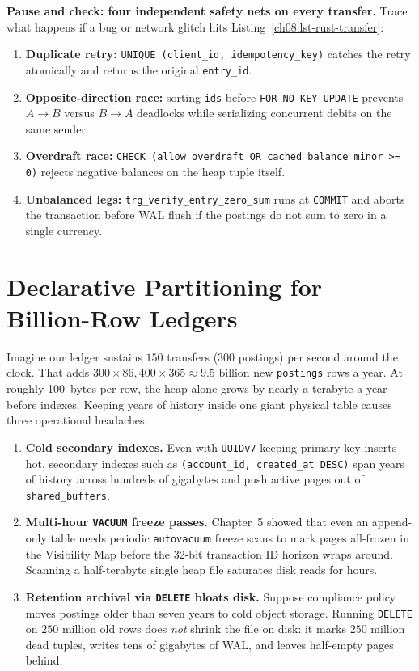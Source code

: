 \begin{recoverybox}
\textbf{Pause and check: four independent safety nets on every transfer.}
Trace what happens if a bug or network glitch hits Listing~\ref{ch08:lst-rust-transfer}:
\begin{enumerate}
  \item \textbf{Duplicate retry:} \texttt{UNIQUE (client\_id, idempotency\_key)} catches the retry atomically and returns the original \texttt{entry\_id}.
  \item \textbf{Opposite-direction race:} sorting \texttt{ids} before \texttt{FOR NO KEY UPDATE} prevents $A \to B$ versus $B \to A$ deadlocks while serializing concurrent debits on the same sender.
  \item \textbf{Overdraft race:} \texttt{CHECK (allow\_overdraft OR cached\_balance\_minor >= 0)} rejects negative balances on the heap tuple itself.
  \item \textbf{Unbalanced legs:} \texttt{trg\_verify\_entry\_zero\_sum} runs at \texttt{COMMIT} and aborts the transaction before WAL flush if the postings do not sum to zero in a single currency.
\end{enumerate}
\end{recoverybox}

\section{Declarative Partitioning for Billion-Row Ledgers}
\label{ch08:partitioning}

Imagine our ledger sustains $150$ transfers ($300$ postings) per second around the
clock. That adds $300 \times 86{,}400 \times 365 \approx 9.5\text{ billion}$ new
\texttt{postings} rows a year. At roughly 100~bytes per row, the heap alone grows
by nearly a terabyte a year before indexes. Keeping years of history inside one
giant physical table causes three operational headaches:

\begin{enumerate}
  \item \textbf{Cold secondary indexes.} Even with \texttt{UUIDv7} keeping primary
    key inserts hot, secondary indexes such as \texttt{(account\_id, created\_at
    DESC)} span years of history across hundreds of gigabytes and push active pages
    out of \texttt{shared\_buffers}.
  \item \textbf{Multi-hour \texttt{VACUUM} freeze passes.} Chapter~5 showed that
    even an append-only table needs periodic \texttt{autovacuum} freeze scans to
    mark pages all-frozen in the Visibility Map before the 32-bit transaction ID
    horizon wraps around. Scanning a half-terabyte single heap file saturates disk
    reads for hours.
  \item \textbf{Retention archival via \texttt{DELETE} bloats disk.} Suppose
    compliance policy moves postings older than seven years to cold object storage.
    Running \texttt{DELETE} on $250\text{ million}$ old rows does \emph{not} shrink
    the file on disk: it marks $250\text{ million}$ dead tuples, writes tens of
    gigabytes of WAL, and leaves half-empty pages behind.
\end{enumerate}

